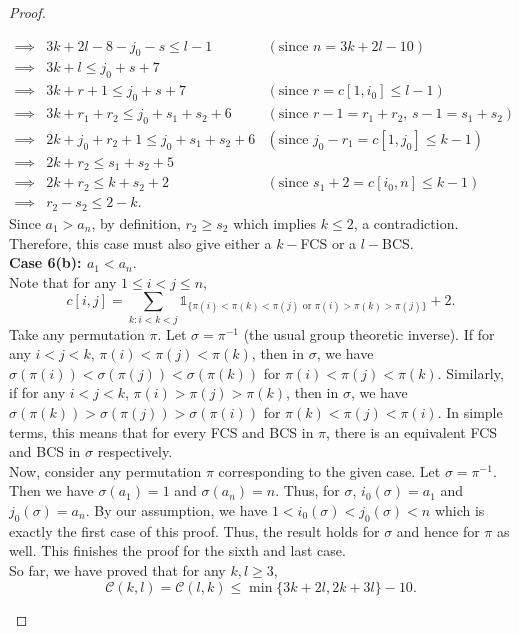 \documentclass[11pt, a4paper]{article}
\theoremstyle{compact}
\begin{document}
\begin{proof}
\begin{enumerate}
\begin{align*}
       \implies & 3k + 2l - 8 - j_0 - s  \leq l - 1 & (\text{since } n = 3k + 2l - 10) \\
       \implies & 3k + l  \leq j_0 + s + 7 \\
       \implies & 3k + r + 1 \leq j_0 + s + 7 & (\text{since } r = c[1, i_0] \leq l -1 ) \\
       \implies & 3k + r_1 + r_2  \leq j_0 + s_1 + s_2 + 6 & (\text{since } r-1 = r_1 + r_2, \, s-1 = s_1 + s_2) \\
       \implies & 2k + j_0 + r_2 + 1 \leq j_0 + s_1 + s_2 + 6 &(\text{since } j_0 - r_1 = c[1, j_0] \leq k -1) \\
       \implies & 2k + r_2 \leq s_1 + s_ 2 + 5 \\
       \implies & 2k + r_2 \leq k + s_2 + 2  & (\text{since } s_1 + 2 = c[i_0, n] \leq k -1) \\
       \implies & r_2 - s_2 \leq 2 - k.
    \end{align*}
    Since $a_1>a_n$, by definition, $r_2 \geq s_2$ which implies $k\leq 2$, a contradiction. Therefore, this case must also give either a $k-$FCS or a $l-$BCS. \\    \textbf{Case 6(b): $a_1<a_n$}. \\
    Note that for any $1 \leq i<j\leq n$, 
    \[
    c[i, j] = \sum_{k:i<k<j} \mathbb{1}_{\{\pi(i) < \pi(k) < \pi(j) \text{ or } \pi(i) > \pi(k) > \pi(j)\}} + 2.
    \]
    Take any permutation $\pi$. Let $\sigma = \pi^{-1} $ (the usual group theoretic inverse). If for any $i<j<k$, $\pi(i)<\pi(j)<\pi(k)$, then in $\sigma$, we have $\sigma(\pi(i))<\sigma(\pi(j)) < \sigma(\pi(k))$ for $\pi(i)<\pi(j)<\pi(k)$. Similarly, if for any $i<j<k$, $\pi(i)>\pi(j)>\pi(k)$, then in $\sigma$, we have $\sigma(\pi(k)) >\sigma(\pi(j)) > \sigma(\pi(i)) $ for $\pi(k)<\pi(j)<\pi(i)$. In simple terms, this means that for every FCS and BCS in $\pi$, there is an equivalent FCS and BCS in $\sigma$ respectively. \\
    Now, consider any permutation $\pi$ corresponding to the given case. Let $\sigma = \pi^{-1} $. Then we have $\sigma(a_1)=1$ and $\sigma(a_n)=n$. Thus, for $\sigma$, $i_0(\sigma) = a_1$ and $j_0(\sigma) = a_n$. By our assumption, we have $1<i_0(\sigma)<j_0(\sigma)<n$ which is exactly the first case of this proof. Thus, the result holds for $\sigma$ and hence for $\pi$ as well. This finishes the proof for the sixth and last case. \\
    So far, we have proved that for any $k, l \geq 3$,
    \[
    \mathcal{C}(k,l) = \mathcal{C}(l,k)  \leq  \min \{ 3k + 2l, 2k + 3l\} - 10.
\]
\end{enumerate}
\end{proof}
\end{document}
